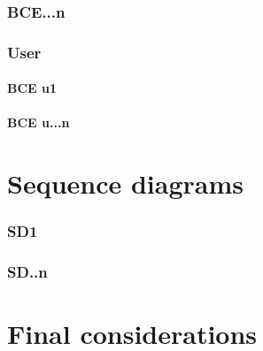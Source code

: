 \documentclass[10pt,a4paper,titlepage]{article}
\begin{document}
\section{BCE...n}
\section{User}
\subsection{BCE u1}
\subsection{BCE u...n}

\clearpage
\part{Sequence diagrams}
\section{SD1}
\section{SD..n}

\clearpage
\part{Final considerations}

\clearpage
\tableofcontents
\end{document}
